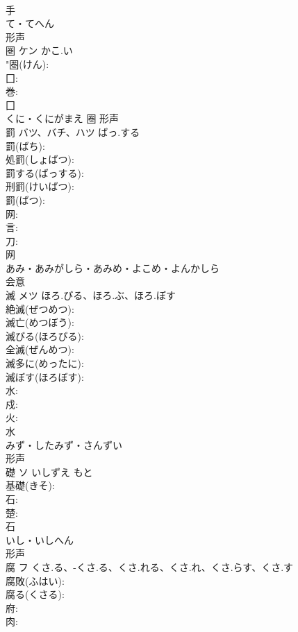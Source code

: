 \documentclass[8pt]{extreport}
\begin{document}
\begin{CJK}{UTF8}{min}
\\	手	
\\	て・てへん	
\\	形声 
\\	圏	ケン	かこ.い		
\\	"圏(けん): 
\\	囗: 
\\	巻: 
\\	囗	
\\	くに・くにがまえ	圈	形声 
\\	罰	バツ、バチ、ハツ	ばっ.する		
\\	罰(ばち): 
\\	処罰(しょばつ): 
\\	罰する(ばっする): 
\\	刑罰(けいばつ): 
\\	罰(ばつ): 
\\	网: 
\\	言: 
\\	刀: 
\\	网	
\\	あみ・あみがしら・あみめ・よこめ・よんかしら	
\\	会意 
\\	滅	メツ	ほろ.びる、ほろ.ぶ、ほろ.ぼす		
\\	絶滅(ぜつめつ): 
\\	滅亡(めつぼう): 
\\	滅びる(ほろびる): 
\\	全滅(ぜんめつ): 
\\	滅多に(めったに): 
\\	滅ぼす(ほろぼす): 
\\	水: 
\\	戍: 
\\	火: 
\\	水	
\\	みず・したみず・さんずい	
\\	形声 
\\	礎	ソ	いしずえ	もと	
\\	基礎(きそ): 
\\	石: 
\\	楚: 
\\	石	
\\	いし・いしへん	
\\	形声 
\\	腐	フ	くさ.る、-くさ.る、くさ.れる、くさ.れ、くさ.らす、くさ.す		
\\	腐敗(ふはい): 
\\	腐る(くさる): 
\\	府: 
\\	肉: 

\end{CJK}
\end{document}
